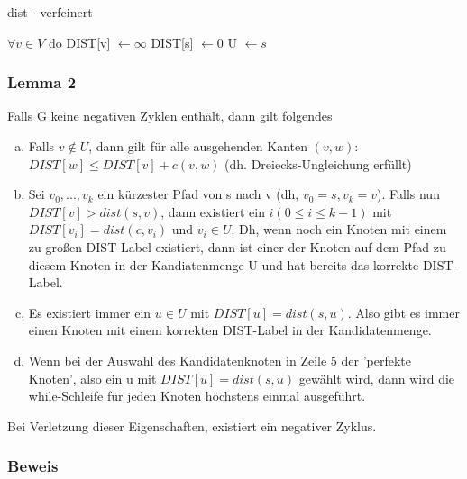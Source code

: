 \begin{algorithm}[H]
\caption{dist - verfeinert}
$\forall v\in V $ do DIST[v] $\gets \infty$ \;
DIST[s] $\gets 0$ \;
U $\gets s$ \;
\end{algorithm}

\subsubsection*{Lemma 2}
Falls G keine negativen Zyklen enthält, dann gilt folgendes
\begin{enumerate}[a)]
    \item Falls $v \notin U $, dann gilt für alle ausgehenden Kanten $(v,w)$: \\
    $DIST[w] \leq DIST[v] + c(v,w)$ (dh. Dreiecks-Ungleichung erfüllt)
    \item Sei $v_0,..., v_k$ ein kürzester Pfad von s nach v (dh, $v_0 = s, v_k = v$). Falls nun $DIST[v]>dist(s,v)$, dann existiert ein $i (0 \leq i \leq k-1)$ mit $DIST[v_i]= dist(c,v_i)$ und $v_i \in U$. Dh, wenn noch ein Knoten mit einem zu großen DIST-Label existiert, dann ist einer der Knoten auf dem Pfad zu diesem Knoten in der Kandiatenmenge U und hat bereits das korrekte DIST-Label.
    \item Es existiert immer ein $u \in U$ mit $DIST[u] = dist(s,u)$. Also gibt es immer einen Knoten mit einem korrekten DIST-Label in der Kandidatenmenge.
    \item Wenn bei der Auswahl des Kandidatenknoten in Zeile 5 der 'perfekte Knoten', also ein u mit $DIST[u]=dist(s,u)$ gewählt wird, dann wird die while-Schleife für jeden Knoten höchstens einmal ausgeführt.
\end{enumerate}
Bei Verletzung dieser Eigenschaften, existiert ein negativer Zyklus.

\subsubsection*{Beweis}

